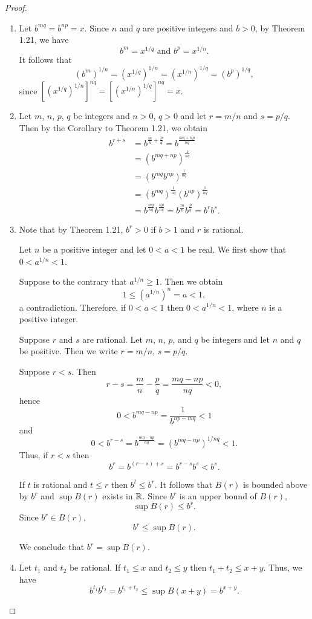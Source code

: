 \begin{proof}
\,
\begin{enumerate}
\item[(a)]
Let $b^{mq}=b^{np}=x$.
Since $n$ and $q$ are positive integers and $b>0$, by Theorem 1.21, we have 
\[
b^m=x^{1/q} \text{ and } b^p=x^{1/n}.
\]
It follows that
\[
(b^m)^{1/n}=(x^{1/q})^{1/n}=(x^{1/n})^{1/q}=(b^p)^{1/q},
\]
since $[(x^{1/q})^{1/n}]^{nq}=[(x^{1/n})^{1/q}]^{nq}=x$.
\item[(b)]Let $m$, $n$, $p$, $q$ be integers and $n>0$, $q>0$ and let $r=m/n$ and $s=p/q$. 
Then by the Corollary to Theorem 1.21, we obtain
\begin{align*}
b^{r+s}
&=b^{\frac{m}{n}+\frac{p}{q}}
=b^{\frac{mq+np}{nq}}\\
&=\left(b^{mq+np}\right)^{\frac{1}{nq}}\\
&=\left(b^{mq}b^{np}\right)^{\frac{1}{nq}}\\
&=\left(b^{mq}\right)^{\frac{1}{nq}} \left(b^{np}\right)^{\frac{1}{nq}}\\
&=b^{\frac{mq}{nq}} b^{\frac{np}{nq}}
=b^{\frac{m}{n}} b^{\frac{p}{q}}
=b^rb^s.
\end{align*}
\item[(c)]
Note that by Theorem 1.21, $b^r>0$ if $b>1$ and $r$ is rational.

Let $n$ be a positive integer and let $0<a<1$ be real. We first show that $0<a^{1/n}<1$.

Suppose to the contrary that $a^{1/n} \geq 1$. Then we obtain 
\[
1 \leq \left(a^{1/n}\right)^n=a<1,
\]
a contradiction. Therefore, if $0<a<1$ then $0<a^{1/n}<1$, where $n$ is a positive integer.

Suppose $r$ and $s$ are rational. 
Let $m$, $n$, $p$, and $q$ be integers and let $n$ and $q$ be positive.
Then we write $r=m/n$, $s=p/q$.

Suppose $r<s$. Then
\[
r-s =\frac{m}{n}-\frac{p}{q} =\frac{mq-np}{nq} <0,
\]
hence
\[
0 < b^{mq-np} = \frac{1}{b^{np-mq}} < 1
\]
and 
\[
0 < b^{r-s} = b^{\frac{mq-np}{nq}} = \left(b^{mq-np}\right)^{1/nq} < 1.
\]
Thus, if $r<s$ then
\[
b^r = b^{(r-s)+s} = b^{r-s}b^s < b^s.
\]

If $t$ is rational and $t \leq r$ then $b^t \leq b^r$. 
It follows that $B(r)$ is bounded above by $b^r$ and $\sup B(r)$ exists in $\mathbb{R}$.
Since $b^r$ is an upper bound of $B(r)$, 
\[
\sup B(r) \leq b^r.
\]
Since $b^r \in B(r)$,
\[
b^r \leq \sup B(r).
\]

We conclude that $b^r = \sup B(r)$.

\item[(d)]
Let $t_1$ and $t_2$ be rational. 
If $t_1 \leq x$ and $t_2 \leq y$ then $t_1+t_2 \leq x+y$.
Thus, we have
\[
b^{t_1}b^{t_2} = b^{t_1+t_2} \leq \sup B(x+y) =b^{x+y}.
\]


\end{enumerate}
\end{proof}

